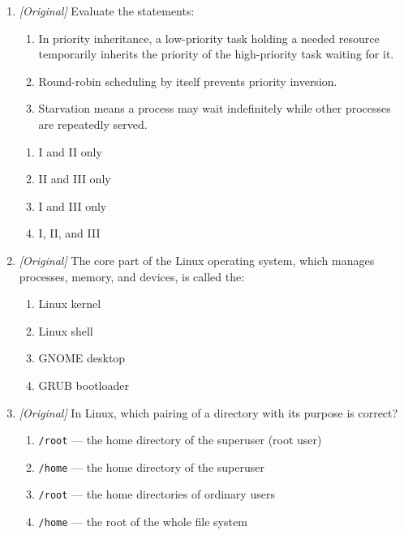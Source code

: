 \begin{enumerate}[label=\textbf{Q\arabic*.}, leftmargin=*]
\begin{enumerate}[label=\Alph*.]
    \item Rapid Task Operating System
    \item Remote Terminal Operating System
    \item Read-Only Operating System
  \end{enumerate}
\item \textit{[Original]} Evaluate the statements:
  \begin{enumerate}[label=\Roman*.]
    \item In priority inheritance, a low-priority task holding a needed
      resource temporarily inherits the priority of the high-priority task
      waiting for it.
    \item Round-robin scheduling by itself prevents priority inversion.
    \item Starvation means a process may wait indefinitely while other
      processes are repeatedly served.
  \end{enumerate}
  \begin{enumerate}[label=\Alph*.]
    \item I and II only
    \item II and III only
    \item I and III only
    \item I, II, and III
  \end{enumerate}
\item \textit{[Original]} The core part of the Linux operating system, which
  manages processes, memory, and devices, is called the:
  \begin{enumerate}[label=\Alph*.]
    \item Linux kernel
    \item Linux shell
    \item GNOME desktop
    \item GRUB bootloader
  \end{enumerate}
\item \textit{[Original]} In Linux, which pairing of a directory with its
  purpose is correct?
  \begin{enumerate}[label=\Alph*.]
    \item \texttt{/root} --- the home directory of the superuser (root user)
    \item \texttt{/home} --- the home directory of the superuser
    \item \texttt{/root} --- the home directories of ordinary users
    \item \texttt{/home} --- the root of the whole file system
  \end{enumerate}

\end{enumerate}

